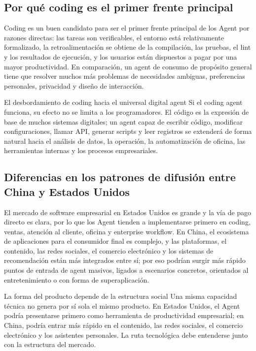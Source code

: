 \documentclass[a4paper]{article}
\begin{document}
\subsection{Por qué coding es el primer frente principal}

Coding es un buen candidato para ser el primer frente principal de los Agent por razones directas: las tareas son verificables, el entorno está relativamente formalizado, la retroalimentación se obtiene de la compilación, las pruebas, el lint y los resultados de ejecución, y los usuarios están dispuestos a pagar por una mayor productividad. En comparación, un agent de consumo de propósito general tiene que resolver muchos más problemas de necesidades ambiguas, preferencias personales, privacidad y diseño de interacción.

\begin{knowledgebox}{El desbordamiento de coding hacia el universal digital agent}
Si el coding agent funciona, su efecto no se limita a los programadores. El código es la expresión de base de muchos sistemas digitales; un agent capaz de escribir código, modificar configuraciones, llamar API, generar scripts y leer registros se extenderá de forma natural hacia el análisis de datos, la operación, la automatización de oficina, las herramientas internas y los procesos empresariales.
\end{knowledgebox}

\subsection{Diferencias en los patrones de difusión entre China y Estados Unidos}

El mercado de software empresarial en Estados Unidos es grande y la vía de pago directo es clara, por lo que los Agent tienden a implementarse primero en coding, ventas, atención al cliente, oficina y enterprise workflow. En China, el ecosistema de aplicaciones para el consumidor final es complejo, y las plataformas, el contenido, las redes sociales, el comercio electrónico y los sistemas de recomendación están más integrados entre sí; por eso podrían surgir más rápido puntos de entrada de agent masivos, ligados a escenarios concretos, orientados al entretenimiento o con forma de superaplicación.

\begin{importantbox}{La forma del producto depende de la estructura social}
Una misma capacidad técnica no genera por sí sola el mismo producto. En Estados Unidos, el Agent podría presentarse primero como herramienta de productividad empresarial; en China, podría entrar más rápido en el contenido, las redes sociales, el comercio electrónico y los asistentes personales. La ruta tecnológica debe entenderse junto con la estructura del mercado.
\end{importantbox}
\end{document}
